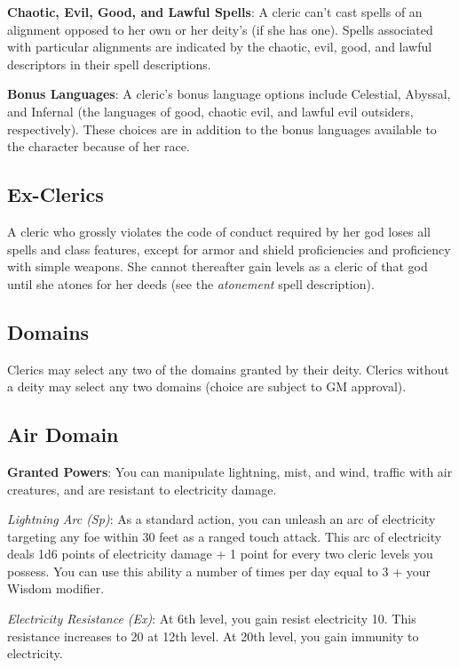 \textbf{Chaotic, Evil, Good, and Lawful Spells}: A cleric can't cast spells of an alignment opposed to her own or her deity's (if she has one). Spells associated with particular alignments are indicated by the chaotic, evil, good, and lawful descriptors in their spell descriptions.
				
\textbf{Bonus Languages}: A cleric's bonus language options include Celestial, Abyssal, and Infernal (the languages of good, chaotic evil, and lawful evil outsiders, respectively). These choices are in addition to the bonus languages available to the character because of her race.
				
\subsection{Ex-Clerics}

				
A cleric who grossly violates the code of conduct required by her god loses all spells and class features, except for armor and shield proficiencies and proficiency with simple weapons. She cannot thereafter gain levels as a cleric of that god until she atones for her deeds (see the \textit{atonement} spell description).
				
\subsection{Domains}

				
Clerics may select any two of the domains granted by their deity. Clerics without a deity may select any two domains (choice are subject to GM approval).
				
\subsection{Air Domain}

				
\textbf{Granted Powers}: You can manipulate lightning, mist, and wind, traffic with air creatures, and are resistant to electricity damage.
				
\textit{Lightning Arc (Sp)}: As a standard action, you can unleash an arc of electricity targeting any foe within 30 feet as a ranged touch attack. This arc of electricity deals 1d6 points of electricity damage + 1 point for every two cleric levels you possess. You can use this ability a number of times per day equal to 3 + your Wisdom modifier. 
				
\textit{Electricity Resistance (Ex)}: At 6th level, you gain resist electricity 10. This resistance increases to 20 at 12th level. At 20th level, you gain immunity to electricity.
				
